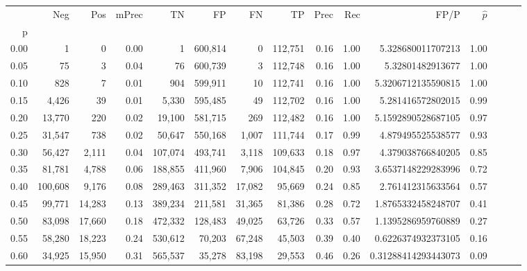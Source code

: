 \begin{tabular}{rrrrrrrrrrrrrrr}
\toprule
{} &      Neg &     Pos & mPrec &       TN &       FP &       FN &       TP &  Prec &   Rec &                    FP/P & $\hat{p}$ \\
p    &          &         &       &          &          &          &          &       &       &                         &           \\
\midrule
0.00 &        1 &       0 &  0.00 &        1 &  600,814 &        0 &  112,751 &  0.16 &  1.00 &       5.328680011707213 &      1.00 \\
0.05 &       75 &       3 &  0.04 &       76 &  600,739 &        3 &  112,748 &  0.16 &  1.00 &        5.32801482913677 &      1.00 \\
0.10 &      828 &       7 &  0.01 &      904 &  599,911 &       10 &  112,741 &  0.16 &  1.00 &      5.3206712135590815 &      1.00 \\
0.15 &    4,426 &      39 &  0.01 &    5,330 &  595,485 &       49 &  112,702 &  0.16 &  1.00 &       5.281416572802015 &      0.99 \\
0.20 &   13,770 &     220 &  0.02 &   19,100 &  581,715 &      269 &  112,482 &  0.16 &  1.00 &      5.1592890528687105 &      0.97 \\
0.25 &   31,547 &     738 &  0.02 &   50,647 &  550,168 &    1,007 &  111,744 &  0.17 &  0.99 &       4.879495525538577 &      0.93 \\
0.30 &   56,427 &   2,111 &  0.04 &  107,074 &  493,741 &    3,118 &  109,633 &  0.18 &  0.97 &       4.379038766840205 &      0.85 \\
0.35 &   81,781 &   4,788 &  0.06 &  188,855 &  411,960 &    7,906 &  104,845 &  0.20 &  0.93 &      3.6537148229283996 &      0.72 \\
0.40 &  100,608 &   9,176 &  0.08 &  289,463 &  311,352 &   17,082 &   95,669 &  0.24 &  0.85 &       2.761412315633564 &      0.57 \\
0.45 &   99,771 &  14,283 &  0.13 &  389,234 &  211,581 &   31,365 &   81,386 &  0.28 &  0.72 &      1.8765332458248707 &      0.41 \\
0.50 &   83,098 &  17,660 &  0.18 &  472,332 &  128,483 &   49,025 &   63,726 &  0.33 &  0.57 &      1.1395286959760889 &      0.27 \\
0.55 &   58,280 &  18,223 &  0.24 &  530,612 &   70,203 &   67,248 &   45,503 &  0.39 &  0.40 &      0.6226374932373105 &      0.16 \\
0.60 &   34,925 &  15,950 &  0.31 &  565,537 &   35,278 &   83,198 &   29,553 &  0.46 &  0.26 &     0.31288414293443073 &      0.09 \\

\end{tabular}
